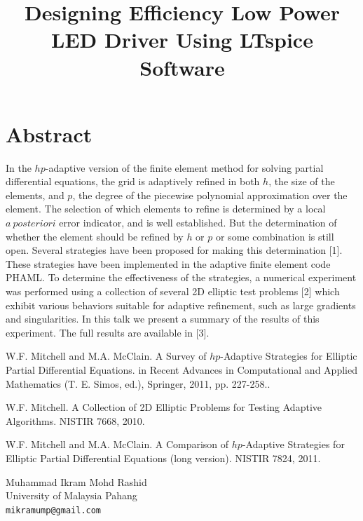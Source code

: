 \documentclass[article, A4, 11pt]{llncs}%
\begin{document}
\section*{Abstract}
In the $hp$-adaptive version of the finite element method for solving partial differential equations, the grid is adaptively refined in both $h$, the size of the elements, and $p$, the degree of the piecewise polynomial approximation over the element.  The selection of which elements to refine is determined by a local $a~posteriori$ error indicator, and is well established.  But the determination of whether the element should be refined by $h$ or $p$ or some combination is still open.  Several strategies have been proposed for making this determination [1].  These strategies have been implemented in the adaptive finite element code PHAML.  To determine the effectiveness of the strategies, a numerical experiment was performed using a collection of several 2D elliptic test problems [2] which exhibit various behaviors suitable for adaptive refinement, such as large gradients and singularities.  In this talk we present a summary of the results of this experiment.  The full results are available in [3].


\begin{thebibliography}{10}
{\sc W.F. Mitchell and M.A. McClain}. {A Survey of $hp$-Adaptive Strategies for Elliptic Partial Differential Equations}. in Recent Advances in Computational and Applied Mathematics (T. E. Simos, ed.), Springer, 2011, pp. 227-258..

{\sc W.F. Mitchell}. {A Collection of 2D Elliptic Problems for Testing Adaptive Algorithms}. NISTIR 7668, 2010.

{\sc W.F. Mitchell and M.A. McClain}. {A Comparison of $hp$-Adaptive Strategies for Elliptic Partial Differential Equations (long version)}. NISTIR 7824, 2011.
\end{thebibliography} %

\title{Designing Efficiency Low Power LED Driver Using LTspice Software}
 \author{} \institute{}
\maketitle
\begin{center}
{\large Muhammad Ikram Mohd Rashid}\\
University of Malaysia Pahang\\
{\tt mikramump@gmail.com}
\end{center}
\end{document}
